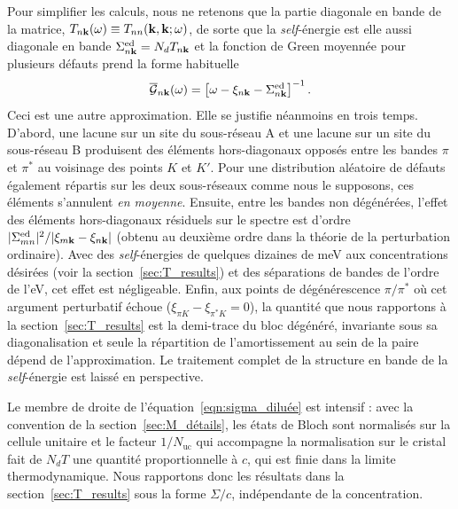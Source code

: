 Pour simplifier les calculs, nous ne retenons que la partie diagonale en bande de la matrice, $T_{n\mathbf{k}}(\omega)\equiv T_{nn}(\mathbf{k},\mathbf{k};\omega)$, de sorte que la \textit{self}-énergie est elle aussi diagonale en bande $\Sigma^\text{ed}_{n\mathbf{k}}=N_dT_{n\mathbf{k}}$ et la fonction de Green moyennée pour plusieurs défauts prend la forme habituelle
\begin{equation}
    \overline{\mathcal{G}}_{n\mathbf{k}}(\omega)=\left[\omega-\xi_{n\mathbf{k}}-\Sigma^\text{ed}_{n\mathbf{k}}\right]^{-1}.\label{eqn:G_moyenne_diag}
\end{equation}
Ceci est une autre approximation. Elle se justifie néanmoins en trois temps. D'abord, une lacune sur un site du sous-réseau A et une lacune sur un site du sous-réseau B produisent des éléments hors-diagonaux opposés entre les bandes $\pi$ et $\pi^*$ au voisinage des points $K$ et $K'$. Pour une distribution aléatoire de défauts également répartis sur les deux sous-réseaux comme nous le supposons, ces éléments s'annulent \textit{en moyenne}. Ensuite, entre les bandes non dégénérées, l'effet des éléments hors-diagonaux résiduels sur le spectre est d'ordre $|\Sigma^\text{ed}_{mn}|^2/|\xi_{m\mathbf{k}}-\xi_{n\mathbf{k}}|$ (obtenu au deuxième ordre dans la théorie de la perturbation ordinaire). Avec des \textit{self}-énergies de quelques dizaines de meV aux concentrations désirées (voir la section~\ref{sec:T_results}) et des séparations de bandes de l'ordre de l'eV, cet effet est négligeable. Enfin, aux points de dégénérescence $\pi/\pi^*$ où cet argument perturbatif échoue ($\xi_{\pi K}-\xi_{\pi^*K}=0$), la quantité que nous rapportons à la section~\ref{sec:T_results} est la demi-trace du bloc dégénéré, invariante sous sa diagonalisation et seule la répartition de l'amortissement au sein de la paire dépend de l'approximation. Le traitement complet de la structure en bande de la \textit{self}-énergie est laissé en perspective.

Le membre de droite de l'équation~\eqref{eqn:sigma_diluée} est intensif : avec la convention de la section~\ref{sec:M_détails}, les états de Bloch sont normalisés sur la cellule unitaire et le facteur $1/N_\text{uc}$ qui accompagne la normalisation sur le cristal fait de $N_dT$ une quantité proportionnelle à $c$, qui est finie dans la limite thermodynamique. Nous rapportons donc les résultats dans la section~\ref{sec:T_results} sous la forme $\Sigma/c$, indépendante de la concentration.

